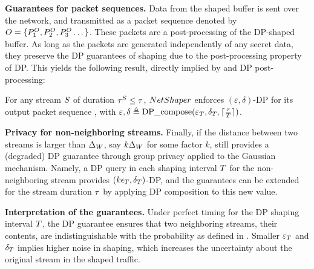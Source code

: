 \textbf{Guarantees for packet sequences.}
Data from the shaped buffer is sent over the network, and transmitted as a
packet sequence denoted by $O = \{{P^O_1}, {P^O_2}, {P^O_3} \dots \}$.
These packets are a post-processing of the DP-shaped buffer. As long as the
packets are generated independently of any secret data, they preserve the
DP guarantees of shaping due to the post-processing property of DP.
This yields the following result, directly implied by 
and DP post-processing:
\begin{corollary}
\label{cor:dp}
For any stream $S$ of duration $\tau^S \leq
\tau$, {${NetShaper}$}
enforces $(\varepsilon, \delta)$-DP for its output packet sequence
\ostream,
with $\varepsilon, \delta \triangleq \textrm{DP\_compose}(\varepsilon_T,
\delta_T, \lceil \frac{\tau}{T} \rceil)$.
\end{corollary}

\textbf{Privacy for non-neighboring streams.}
Finally, if the distance between two streams is larger than $\Delta_{W}$, \eg say
$k\Delta_{W}$ for some factor $k$, {\sys} still provides a (degraded) DP guarantee
through group privacy \cite[Theorem 2.2]{dwork2014algorithmic} applied to the
Gaussian mechanism.
Namely, a DP query in each shaping interval $T$ for the non-neighboring
stream provides $(k\epsilon_T, \delta_T)$-DP, and the guarantees
can be extended for the stream duration $\tau$ by applying DP
composition to this new value.


\textbf{Interpretation of the guarantees.}
%
Under perfect timing for the DP shaping interval $T$, the DP guarantee
ensures that two neighboring streams, \ie their contents, are indistinguishable
with the probability as defined in . Smaller
$\varepsilon_{T}$ and $\delta_{T}$ implies higher noise in
shaping, which increases the uncertainty about the original stream in the shaped
traffic.

